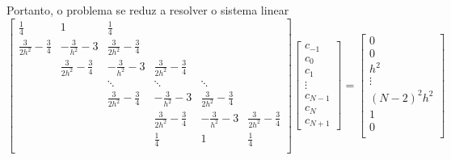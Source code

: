 \documentclass{article}
\begin{document}
    Portanto, o problema se reduz a resolver o sistema linear
    $$
        \begin{bmatrix}
            \frac{1}{4} & 1 & \frac{1}{4} & & & \\
            \frac{3}{2h^2} - \frac{3}{4} & -\frac{3}{h^2} - 3 & \frac{3}{2h^2} - \frac{3}{4} & & & \\
            & \frac{3}{2h^2} - \frac{3}{4} & -\frac{3}{h^2} - 3 & \frac{3}{2h^2} - \frac{3}{4} & & \\
            & & \ddots & \ddots & \ddots & \\
            & & \frac{3}{2h^2} - \frac{3}{4} & -\frac{3}{h^2} - 3 & \frac{3}{2h^2} - \frac{3}{4} & \\
            & & &  \frac{3}{2h^2} - \frac{3}{4} & -\frac{3}{h^2} - 3 & \frac{3}{2h^2} - \frac{3}{4} \\
            & & & \frac{1}{4} & 1 & \frac{1}{4} \\
        \end{bmatrix} \begin{bmatrix}
            c_{-1} \\
            c_0 \\
            c_1 \\
            \vdots \\
            c_{N-1} \\
            c_N \\
            c_{N+1}
        \end{bmatrix} = \begin{bmatrix}
            0 \\
            0 \\
            h^2 \\
            \vdots \\
            (N - 2)^2h^2 \\
            1 \\
            0 \\
        \end{bmatrix}
    $$
\end{document}
